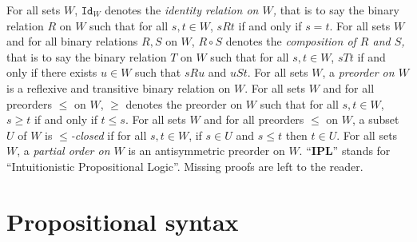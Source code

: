 \documentclass[draft]{article}
\def\Id{\mathtt{Id}}
\def\IPL{\mathbf{IPL}}
\begin{document}
For all sets $W$, $\Id_{W}$ denotes the {\em identity relation on $W$,} that is to say the binary relation $R$ on $W$ such that for all $s,t{\in}W$, $s{R}t$ if and only if $s{=}t$.
For all sets $W$ and for all binary relations $R,S$ on $W$, ${R}{\circ}{S}$ denotes the {\em composition of $R$ and $S$,} that is to say the binary relation $T$ on $W$ such that for all $s,t{\in}W$, $s{T}t$ if and only if there exists $u{\in}W$ such that $s{R}u$ and $u{S}t$.
For all sets $W$, a {\em preorder on $W$}\/ is a reflexive and transitive binary relation on $W$.
For all sets $W$ and for all preorders $\leq$ on $W$, $\geq$ denotes the preorder on $W$ such that for all $s,t{\in}W$, $s{\geq}t$ if and only if $t{\leq}s$.
For all sets $W$ and for all preorders $\leq$ on $W$, a subset $U$ of $W$ is {\em $\leq$-closed}\/ if for all $s,t{\in}W$, if $s{\in}U$ and $s{\leq}t$ then $t{\in}U$.
For all sets $W$, a {\em partial order on $W$}\/ is an antisymmetric preorder on $W$.
``$\IPL$'' stands for ``Intuitionistic Propositional Logic''.
Missing proofs are left to the reader.
%
%
%
%
\section{Propositional syntax}\label{section:syntax}
%
%
%
%
\end{document}
